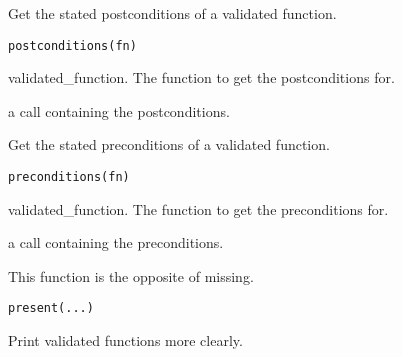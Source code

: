 \documentclass[a4paper]{book}
\begin{document}
%
\begin{Description}\relax
Get the stated postconditions of a validated function.
\end{Description}
%
\begin{Usage}
\begin{verbatim}
postconditions(fn)
\end{verbatim}
\end{Usage}
%
\begin{Arguments}
\begin{ldescription}
\item[\code{fn}] validated\_function. The function to get the postconditions for.
\end{ldescription}
\end{Arguments}
%
\begin{Value}
a call containing the postconditions.
\end{Value}
%
\begin{Description}\relax
Get the stated preconditions of a validated function.
\end{Description}
%
\begin{Usage}
\begin{verbatim}
preconditions(fn)
\end{verbatim}
\end{Usage}
%
\begin{Arguments}
\begin{ldescription}
\item[\code{fn}] validated\_function. The function to get the preconditions for.
\end{ldescription}
\end{Arguments}
%
\begin{Value}
a call containing the preconditions.
\end{Value}
%
\begin{Description}\relax
This function is the opposite of missing.
\end{Description}
%
\begin{Usage}
\begin{verbatim}
present(...)
\end{verbatim}
\end{Usage}
%
\begin{Description}\relax
Print validated functions more clearly.
\end{Description}
\end{document}
